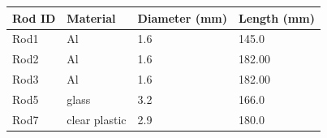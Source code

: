 \begin{tabular}{llll}
\toprule
Rod ID & Material & Diameter (mm) & Length (mm) \\
\midrule
Rod1 & Al & 1.6 & 145.0 \\
Rod2 & Al & 1.6 & 182.00 \\
Rod3 & Al & 1.6 & 182.00 \\
Rod5 &  glass & 3.2 & 166.0 \\
Rod7 &  clear plastic & 2.9 & 180.0 \\
\bottomrule
\end{tabular}
